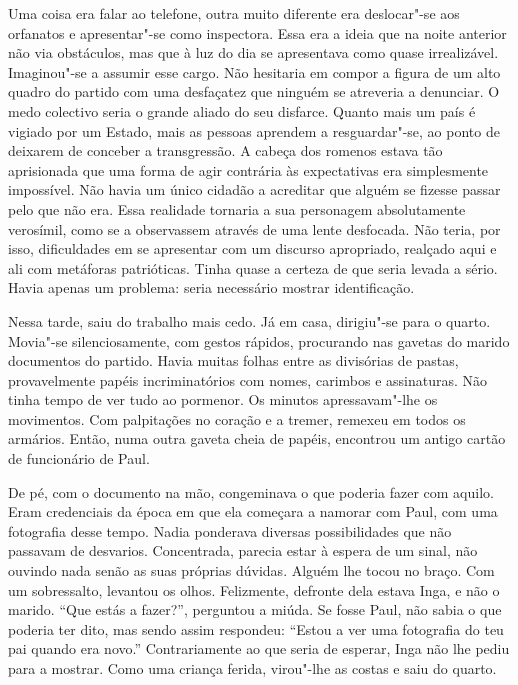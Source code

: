 Uma coisa era falar ao telefone, outra muito diferente era deslocar"-se
aos orfanatos e apresentar"-se como inspectora. Essa era a ideia que na
noite anterior não via obstáculos, mas que à luz do dia se apresentava
como quase irrealizável. Imaginou"-se a assumir esse cargo. Não hesitaria em compor a figura de um alto quadro do partido com uma desfaçatez
que ninguém se atreveria a denunciar. O medo colectivo seria o grande
aliado do seu disfarce. Quanto mais um país é vigiado por um Estado,
mais as pessoas aprendem a resguardar"-se, ao ponto de deixarem de
conceber a transgressão. A cabeça dos romenos estava tão aprisionada que
uma forma de agir contrária às expectativas era simplesmente
impossível. Não havia um único cidadão a acreditar que alguém se fizesse
passar pelo que não era. Essa realidade tornaria a sua personagem
absolutamente verosímil, como se a observassem através de uma lente desfocada.
Não teria, por isso, dificuldades em se apresentar com um discurso
apropriado, realçado aqui e ali com metáforas patrióticas. Tinha quase a
certeza de que seria levada a sério. Havia apenas um problema: seria
necessário mostrar identificação.

Nessa tarde, saiu do trabalho mais cedo. Já em casa, dirigiu"-se para o
quarto. Movia"-se silenciosamente, com gestos rápidos, procurando nas
gavetas do marido documentos do partido. Havia muitas folhas entre as
divisórias de pastas, provavelmente papéis incriminatórios com nomes,
carimbos e assinaturas. Não tinha tempo de ver tudo ao pormenor. Os
minutos apressavam"-lhe os movimentos. Com palpitações no coração e a
tremer, remexeu em todos os armários. Então, numa outra gaveta cheia de
papéis, encontrou um antigo cartão de funcionário de Paul.

De pé, com o documento na mão, congeminava o que poderia fazer com
aquilo. Eram credenciais da época em que ela começara a namorar com
Paul, com uma fotografia desse tempo. Nadia ponderava diversas
possibilidades que não passavam de desvarios. Concentrada, parecia estar
à espera de um sinal, não ouvindo nada senão as suas próprias dúvidas.
Alguém lhe tocou no braço. Com um sobressalto, levantou os olhos.
Felizmente, defronte dela estava Inga, e não o marido. ``Que estás a
fazer?'', perguntou a miúda. Se fosse Paul, não sabia o que poderia ter
dito, mas sendo assim respondeu: ``Estou a ver uma fotografia do teu pai
quando era novo.'' Contrariamente ao que seria de esperar, Inga não lhe
pediu para a mostrar.
Como uma criança ferida, virou"-lhe as costas e saiu do quarto.

